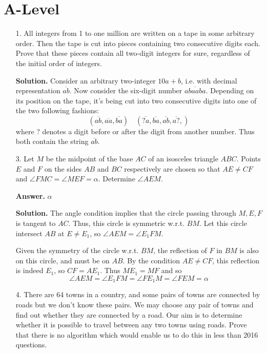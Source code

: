 \documentclass[11pt,a4paper]{article}
\begin{document}
\section*{A-Level}
\begin{enumerate}
	\item[1.] 
	All integers from 1 to one million are written on a tape in some arbitrary order. Then the
	tape is cut into pieces containing two consecutive digits each. Prove that these pieces contain
	all two-digit integers for sure, regardless of the initial order of integers.
	
	\textbf{Solution.} Consider an arbitrary two-integer $10a+b$, 
	i.e. with decimal representation $\overline{ab}$. 
	Now consider the six-digit number $\overline{abaaba}$. 
	Depending on its position on the tape, it's being cut into two consecutive digits into one of the two following fashions: 
	\[
	(\overline{ab}, \overline{aa}, \overline{ba})
	\quad 
	(\overline{?a}, \overline{ba}, \overline{ab},  \overline{a?}, 
	)
	\]
	where ? denotes a digit before or after the digit from another number. 
	Thus both contain the string $\overline{ab}$. 
	
	\item[3.]
	 Let $M$ be the midpoint of the base $AC$ of an isosceles triangle $ABC$. Points $E$ and $F$ on
	the sides $AB$ and $BC$ respectively are chosen so that $AE \neq CF$ and $\angle FMC = \angle MEF = \alpha$.
	Determine $\angle AEM$.
	
	\textbf{Answer.} $\alpha$
	
	\textbf{Solution.} 
	The angle condition implies that the circle passing through $M, E, F$ is tangent to $AC$. 
	Thus, this circle is symmetric w.r.t. $BM$. 
	Let this circle intersect $AB$ at $E\neq E_1$, 
	so $\angle AEM=\angle E_1FM$. 
	
	Given the symmetry of the circle w.r.t. $BM$, the reflection of $F$ in $BM$ is also on this circle, and must be on $AB$. 
	By the condition $AE\neq CF$, this reflection is indeed $E_1$, so $CF=AE_1$. 
	Thus $ME_1=MF$ and so 
	\[
	\angle AEM=\angle E_1FM=\angle FE_1M=\angle FEM=\alpha
	\]
	
	\item[4.]
	There are 64 towns in a country, and some pairs of towns are connected by roads but we
	don’t know these pairs. We may choose any pair of towns and find out whether they are
	connected by a road. Our aim is to determine whether it is possible to travel between any
	two towns using roads. Prove that there is no algorithm which would enable us to do this
	in less than 2016 questions.
	

\end{enumerate}
\end{document}
